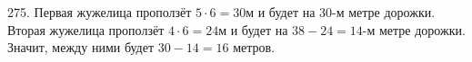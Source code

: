 275. Первая жужелица проползёт $5\cdot6=30$м и будет на 30-м метре дорожки. Вторая жужелица проползёт $4\cdot6=24$м и будет на $38-24=14$-м метре дорожки. Значит, между ними будет $30-14=16$ метров.\\
